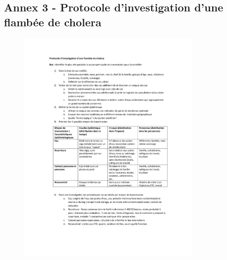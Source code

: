 \documentclass[]{tufte-handout}
\begin{document}
\clearpage

\subsection{Annex 3 - Protocole d'investigation d'une flambée de
cholera}\label{annex-3---protocole-dinvestigation-dune-flambee-de-cholera}

\begin{figure}
\includegraphics[width=0.8\textwidth]{annex/inv_protocole.pdf}
\end{figure}

\clearpage

\renewcommand\refname{References}

\end{document}

